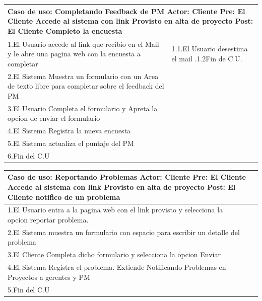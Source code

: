 \begin{longtable}{|p{}|p{}|}
    \hline
    \multicolumn{2}{|p{16cm}|}{
        \textbf{Caso de uso:} Completando Feedback de PM\newline
        \textbf{Actor:} Cliente\newline
        \textbf{Pre: }El Cliente Accede al sistema con link Provisto en alta de proyecto\newline
        \textbf{Post: }El Cliente Completo la encuesta
    }\\
    \hline
    1.El Usuario accede al link que recibio en el Mail y le abre una pagina web con la encuesta a completar & 1.1.El Usuario desestima el mail .\newline 1.2Fin de C.U.\\
    \hline
    2.El Sistema Muestra un formulario con un Area de texto libre para completar sobre el feedback del PM &\\
    \hline 
    3.El Usuario Completa el formulario y Apreta la opcion de enviar el formulario& \\
    \hline
    4.El Sistema Registra la nueva encuesta&\\
    \hline
    5.El Sistema actualiza el puntaje del PM&\\
    \hline
    6.Fin del C.U&\\
    \hline
\end{longtable}

\begin{longtable}{|p{}|p{}|}
    \hline
    \multicolumn{2}{|p{16cm}|}{
        \textbf{Caso de uso:} Reportando Problemas\newline
        \textbf{Actor:} Cliente\newline
        \textbf{Pre: }El Cliente Accede al sistema con link Provisto en alta de proyecto\newline
        \textbf{Post: }El Cliente notifico de un problema
    }\\
    \hline
    1.El Usuario entra a la pagina web con el link provisto y selecciona la opcion reportar problema.&\\
    \hline
    2.El Sistema muestra un formulario con espacio para escribir un detalle del problema&    \\
    \hline
    3.El Cliente Completa dicho formulario y selecciona la opcion Enviar& \\
    \hline
    4.El Sistema Registra el problema. Extiende Notificando Problemas en Proyectos a gerentes y PM&\\
    \hline
    5.Fin del C.U&\\
    \hline
\end{longtable}

